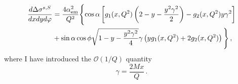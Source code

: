\begin{equation}
  \begin{split}
    \frac{d \Delta \sigma^{s,S}}{dx dy d\varphi} & = \frac{4 \alpha_{\textrm{em}}^2}{Q^2} \Biggl\{ \cos \alpha \left[ g_1(x,Q^2) \left( 2 - y - \frac{y^2 \gamma^2}{2} \right) - g_2(x,Q^2) y \gamma^2 \right] \Biggr.\\
    & + \sin \alpha \cos \phi \sqrt{1 - y - \frac{y^2 \gamma^2}{4}} \gamma \left( y g_1(x,Q^2) + 2 g_2(x,Q^2) \right) \Biggl. \Biggr\}\,,
  \end{split}
  \label{eq:cs_diff_fin_S}
\end{equation}
where I have introduced the $\mathcal{O}(1/Q)$ quantity 
\begin{equation}
  \gamma = \frac{2Mx}{Q} \,.
  \label{eq:gamma}
\end{equation}

